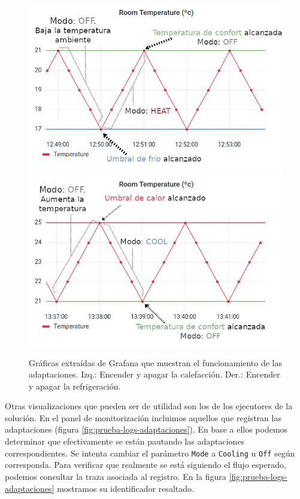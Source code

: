 \begin{figure}[h]
  \hspace{-1.2cm}
  \includegraphics[scale=0.42]{cap_despliegue/images/pruebas-temperatura-calentar}
  \includegraphics[scale=0.42]{cap_despliegue/images/pruebas-temperatura-enfriar}
  \caption{Gráficas extraídas de Grafana que muestran el funcionamiento de las adaptaciones. Izq.: Encender y apagar la calefacción. Der.: Encender y apagar la refrigeración.}
  \label{fig:pruebas-temperatura}
\end{figure}

Otras visualizaciones que pueden ser de utilidad son los  de los ejecutores de la solución. En el panel de monitorización incluimos aquellos que registran las adaptaciones (figura \ref{fig:prueba-logs-adaptaciones}). En base a ellos podemos determinar que efectivamente se están pautando las adaptaciones correspondientes. Se intenta cambiar el parámetro \texttt{Mode} a \texttt{Cooling} u \texttt{Off} según corresponda. Para verificar que realmente se está siguiendo el flujo esperado, podemos consultar la traza asociada al registro. En la figura \ref{fig:prueba-logs-adaptaciones} mostramos su identificador resaltado.

